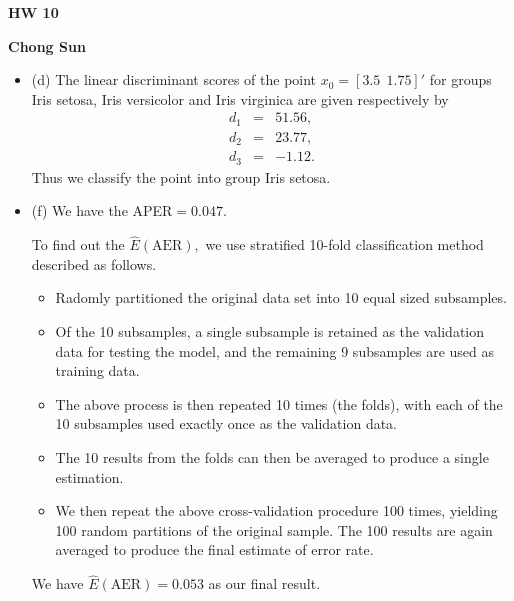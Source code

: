 \documentclass[12pt,twoside]{article}
\newcommand{\bbbb}{\begin{eqnarray*}}
\newcommand{\eeee}{\end{eqnarray*}}
\theoremstyle{definition}
\begin{document}
\begin{center}
{\Large\bf HW 10}
\end{center}
{\large\bf Chong Sun}
\begin{itemize}
\item (d) The linear discriminant scores of the point $x_0 = [3.5 ~~1.75]'$ for groups Iris setosa, Iris versicolor and Iris virginica are given respectively by
\bbbb
d_1 &=& 51.56,\\
d_2 &=& 23.77,\\
d_3 &=& -1.12.
\eeee
Thus we classify the point into group Iris setosa.

\item (f) We have the APER$=0.047. $

To find out the $\hat{E}(\text{AER}),$ we use stratified 10-fold classification method described as follows.
\begin{itemize}
\item Radomly partitioned the original data set into 10 equal sized subsamples.
\item Of the 10 subsamples, a single subsample is retained as the validation data for testing the model, and the remaining 9 subsamples are used as training data.
\item The above process is then repeated 10 times (the folds), with each of the 10 subsamples used exactly once as the validation data.
\item The 10 results from the folds can then be averaged to produce a single estimation.
\item  We then repeat the above cross-validation procedure 100 times, yielding 100 random partitions of the original sample. The 100 results are again averaged to produce the final estimate of error rate.
\end{itemize}

We have $\hat{E}(\text{AER})=0.053$ as our final result.
\end{itemize}
\end{document}
